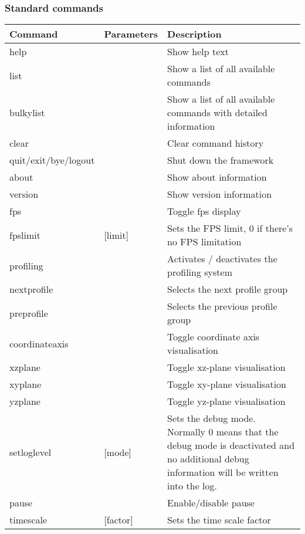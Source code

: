 \subsubsection{Standard commands}
\begin{tabular}{|p{4cm}|p{2.4cm}|p{7.2cm}|}
\hline
\textbf{Command} & \textbf{Parameters} & \textbf{Description}\\
\hline
help                 &          & Show help text\\
\hline
list                 &          & Show a list of all available commands\\
\hline
bulkylist            &          & Show a list of all available commands with detailed information\\
\hline
clear                &          & Clear command history\\
\hline
quit/exit/bye/logout &          & Shut down the framework\\
\hline
about                &          & Show about information\\
\hline
version              &          & Show version information\\
\hline
fps                  &          & Toggle fps display\\
\hline
fpslimit             & [limit]  & Sets the FPS limit, 0 if there's no FPS limitation\\
\hline
profiling            &          & Activates / deactivates the profiling system\\
\hline
nextprofile          &          & Selects the next profile group\\
\hline
preprofile           &          & Selects the previous profile group\\
\hline
coordinateaxis       &          & Toggle coordinate axis visualisation\\
\hline
xzplane              &          & Toggle xz-plane visualisation\\
\hline
xyplane              &          & Toggle xy-plane visualisation\\
\hline
yzplane              &          & Toggle yz-plane visualisation\\
\hline
setloglevel          & [mode]   & Sets the debug mode. Normally 0 means that the debug mode is deactivated and no additional debug information will be written into the log.\\
\hline
pause                &          & Enable/disable pause\\
\hline
timescale            & [factor] & Sets the time scale factor\\
\hline
\end{tabular}



